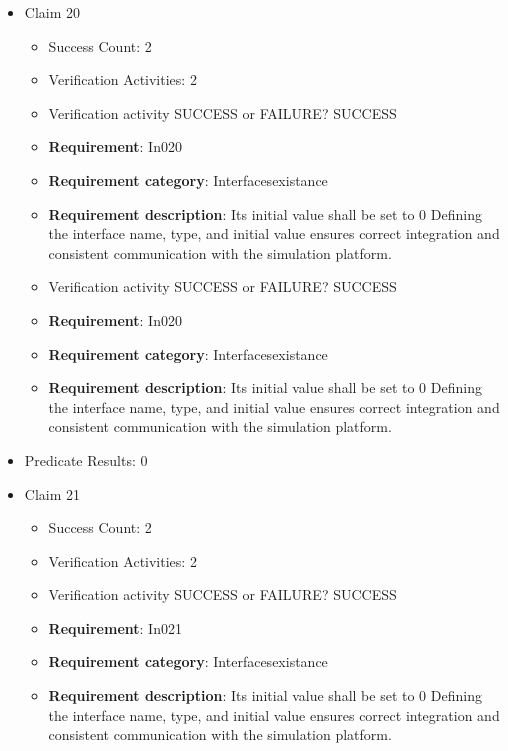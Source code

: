 \documentclass{article}
\begin{document}
\begin{itemize}
  				  \item Claim 20
				\begin{itemize}
			    	\item Success Count: 2 
			    	\item Verification Activities: 2
					\item Verification activity SUCCESS or FAILURE? SUCCESS
		
						\item \textbf{Requirement}: In020 
						\item \textbf{Requirement category}: Interfacesexistance 
						\item \textbf{Requirement description}: Its initial value shall be set to 0 Defining the interface name, type, and initial value ensures correct integration and consistent communication with the simulation platform.
					
					\item Verification activity SUCCESS or FAILURE? SUCCESS
		
						\item \textbf{Requirement}: In020 
						\item \textbf{Requirement category}: Interfacesexistance 
						\item \textbf{Requirement description}: Its initial value shall be set to 0 Defining the interface name, type, and initial value ensures correct integration and consistent communication with the simulation platform.
					
				\end{itemize}
				
									    
				\item Predicate Results: 0

  				  \item Claim 21
				\begin{itemize}
			    	\item Success Count: 2 
			    	\item Verification Activities: 2
					\item Verification activity SUCCESS or FAILURE? SUCCESS
		
						\item \textbf{Requirement}: In021 
						\item \textbf{Requirement category}: Interfacesexistance 
						\item \textbf{Requirement description}: Its initial value shall be set to 0 Defining the interface name, type, and initial value ensures correct integration and consistent communication with the simulation platform.
					

\end{itemize}
\end{itemize}
\end{document}
